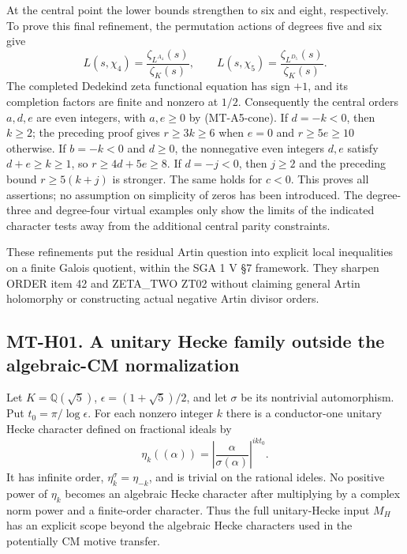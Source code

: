 At the central point the lower bounds strengthen to six and eight,
respectively. To prove this final refinement, the permutation actions
of degrees five and six give
\[
 L(s,\chi_4)=\frac{\zeta_{L^{A_4}}(s)}{\zeta_K(s)},\qquad
 L(s,\chi_5)=\frac{\zeta_{L^{D_5}}(s)}{\zeta_K(s)}.
\]
The completed Dedekind zeta functional equation has sign $+1$, and
its completion factors are finite and nonzero at $1/2$. Consequently
the central orders $a,d,e$ are even integers, with $a,e\ge0$ by
(MT-A5-cone). If $d=-k<0$, then $k\ge2$; the preceding proof gives
$r\ge3k\ge6$ when $e=0$ and $r\ge5e\ge10$ otherwise.
If $b=-k<0$ and $d\ge0$, the nonnegative even integers $d,e$
satisfy $d+e\ge k\ge1$, so $r\ge4d+5e\ge8$.
If $d=-j<0$, then $j\ge2$ and the preceding bound
$r\ge5(k+j)$ is stronger. The same holds for $c<0$.
This proves all assertions; no assumption on simplicity of zeros has
been introduced. The degree-three and degree-four virtual examples
only show the limits of the indicated character tests away from the
additional central parity constraints.

These refinements put the residual Artin question into explicit local
inequalities on a finite Galois quotient, within the SGA 1 V \S7
framework. They sharpen ORDER item 42 and ZETA\_TWO ZT02 without
claiming general Artin holomorphy or constructing actual negative
Artin divisor orders.

\subsection*{MT-H01. A unitary Hecke family outside the algebraic-CM normalization}
Let $K=\mathbb Q(\sqrt5)$, $\epsilon=(1+\sqrt5)/2$, and let $\sigma$
be its nontrivial automorphism. Put $t_0=\pi/\log\epsilon$.
For each nonzero integer $k$ there is a conductor-one unitary Hecke
character defined on fractional ideals by
\[
       \eta_k((\alpha))=
       \left|\frac{\alpha}{\sigma(\alpha)}\right|^{ik t_0}.
                                                               \tag{MT-H1}
\]
It has infinite order, $\eta_k^\sigma=\eta_{-k}$, and is trivial
on the rational ideles. No positive power of $\eta_k$ becomes an
algebraic Hecke character after multiplying by a complex norm power
and a finite-order character. Thus the full unitary-Hecke input $M_H$
has an explicit scope beyond the algebraic Hecke characters used in
the potentially CM motive transfer.

